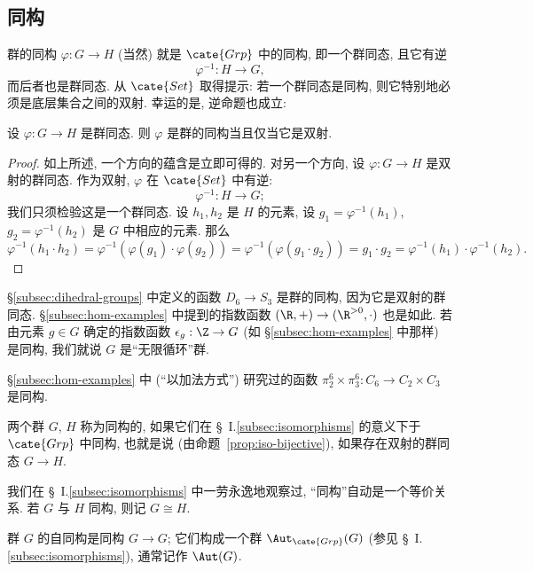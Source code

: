 \subsection{同构}
\label{subsec:iso-groups}

群的同构 $\varphi : G \to H$ (当然) 就是 $\cate{Grp}$ 中的同构, 即一个群同态, 且它有逆
\[
\varphi^{-1} : H \to G,
\]
而后者也是群同态. 从 $\cate{Set}$ 取得提示: 若一个群同态是同构, 则它特别地必须是底层集合之间的双射. 幸运的是, 逆命题也成立:

\begin{proposition}
\label{prop:iso-bijective}
设 $\varphi : G \to H$ 是群同态. 则 $\varphi$ 是群的同构当且仅当它是双射.
\end{proposition}

\begin{proof}
如上所述, 一个方向的蕴含是立即可得的. 对另一个方向, 设 $\varphi : G \to H$ 是双射的群同态. 作为双射, $\varphi$ 在 $\cate{Set}$ 中有逆:
\[
\varphi^{-1} : H \to G;
\]
我们只须检验这是一个群同态. 设 $h_1, h_2$ 是 $H$ 的元素, 设 $g_1 = \varphi^{-1}(h_1)$, $g_2 = \varphi^{-1}(h_2)$ 是 $G$ 中相应的元素. 那么
\[
\varphi^{-1}(h_1 \cdot h_2) = \varphi^{-1}(\varphi(g_1) \cdot \varphi(g_2)) = \varphi^{-1}(\varphi(g_1 \cdot g_2)) = g_1 \cdot g_2 = \varphi^{-1}(h_1) \cdot \varphi^{-1}(h_2).
\]
\end{proof}

\begin{example}
\label{ex:D6-iso-S3}
\S\ref{subsec:dihedral-groups} 中定义的函数 $D_6 \to S_3$ 是群的同构, 因为它是双射的群同态. \S\ref{subsec:hom-examples} 中提到的指数函数 $(\R, +) \to (\R^{>0}, \cdot)$ 也是如此. 若由元素 $g \in G$ 确定的指数函数 $\epsilon_g : \Z \to G$ (如 \S\ref{subsec:hom-examples} 中那样) 是同构, 我们就说 $G$ 是``无限循环''群.

\S\ref{subsec:hom-examples} 中 (``以加法方式'') 研究过的函数 $\pi_2^6 \times \pi_3^6 : C_6 \to C_2 \times C_3$ 是同构.
\end{example}

\begin{definition}
\label{def:isomorphic-groups}
两个群 $G$, $H$ 称为同构的, 如果它们在 \S~I.\ref{subsec:isomorphisms} 的意义下于 $\cate{Grp}$ 中同构, 也就是说 (由命题~\ref{prop:iso-bijective}), 如果存在双射的群同态 $G \to H$.
\end{definition}

我们在 \S~I.\ref{subsec:isomorphisms} 中一劳永逸地观察过, ``同构''自动是一个等价关系. 若 $G$ 与 $H$ 同构, 则记 $G \cong H$.

群 $G$ 的自同构是同构 $G \rightarrow G$; 它们构成一个群 $\Aut_{\cate{Grp}}(G)$ (参见 \S~I.\ref{subsec:isomorphisms}), 通常记作 $\Aut(G)$.

